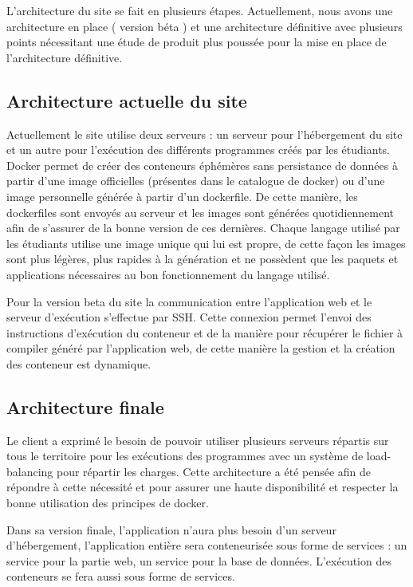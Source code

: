 \par L’architecture du site se fait en plusieurs étapes. Actuellement, nous avons une architecture en place ( version béta ) et une architecture définitive avec plusieurs points nécessitant une étude de produit plus poussée pour la mise en place de l’architecture définitive.

\subsection{Architecture actuelle du site}

\par Actuellement le site utilise deux serveurs : un serveur pour l’hébergement du site et un autre pour l’exécution des différents programmes créés par les étudiants. Docker permet de créer des conteneurs éphémères sans persistance de données à partir d’une image officielles (présentes dans le catalogue de docker) ou d’une image personnelle générée à partir d’un dockerfile. De cette manière, les dockerfiles sont envoyés au serveur et les images sont générées quotidiennement afin de s’assurer de la bonne version de ces dernières. Chaque langage utilisé par les étudiants utilise une image unique qui lui est propre, de cette façon les images sont plus légères, plus rapides à la génération et ne possèdent que les paquets et applications nécessaires au bon fonctionnement du langage utilisé. 

\par Pour la version beta du site la communication entre l’application web et le serveur d'exécution s’effectue par SSH. Cette connexion permet l'envoi des instructions  d'exécution du conteneur et de la manière pour récupérer le fichier à compiler généré par l’application web, de cette manière la gestion et la création des conteneur est dynamique.

\subsection{Architecture finale}

\par Le client a exprimé le besoin de pouvoir utiliser plusieurs serveurs répartis sur tous le territoire pour les exécutions des programmes avec un système de load-balancing pour répartir les charges.
Cette architecture a été pensée afin de répondre à cette nécessité et pour assurer une haute disponibilité et respecter la bonne utilisation des principes de docker.

\par Dans sa version finale, l’application n’aura plus besoin d’un serveur d’hébergement, l’application entière sera conteneurisée sous forme de services : un service pour la partie web, un service pour la base de données. L’exécution des conteneurs se fera aussi sous forme de services.

